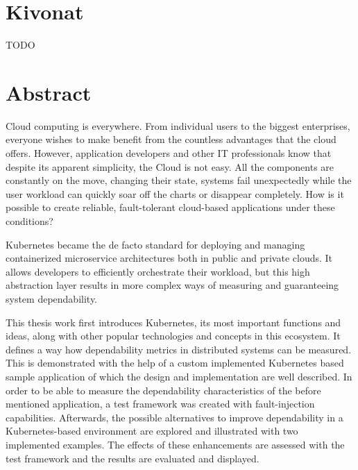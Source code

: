 \setcounter{page}{1}

\selecthungarian

\chapter*{Kivonat}

TODO


\vfill
\selectenglish


\chapter*{Abstract}

Cloud computing is everywhere. From individual users to the biggest enterprises, everyone wishes to make benefit from the countless advantages that the cloud offers. However, application developers and other IT professionals know that despite its apparent simplicity, the Cloud is not easy. All the components are constantly on the move, changing their state, systems fail unexpectedly while the user workload can quickly soar off the charts or disappear completely. How is it possible to create reliable, fault-tolerant cloud-based applications under these conditions?

Kubernetes became the de facto standard for deploying and managing containerized microservice architectures both in public and private clouds. It allows developers to efficiently orchestrate their workload, but this high abstraction layer results in more complex ways of measuring and guaranteeing system dependability.

This thesis work first introduces Kubernetes, its most important functions and ideas, along with other popular technologies and concepts in this ecosystem. It defines a way how dependability metrics in distributed systems can be measured. This is demonstrated with the help of a custom implemented Kubernetes based sample application of which the design and implementation are well described. In order to be able to measure the dependability characteristics of the before mentioned application, a test framework was created with fault-injection capabilities. Afterwards, the possible alternatives to improve dependability in a Kubernetes-based environment are explored and illustrated with two implemented examples. The effects of these enhancements are assessed with the test framework and the results are evaluated and displayed.


